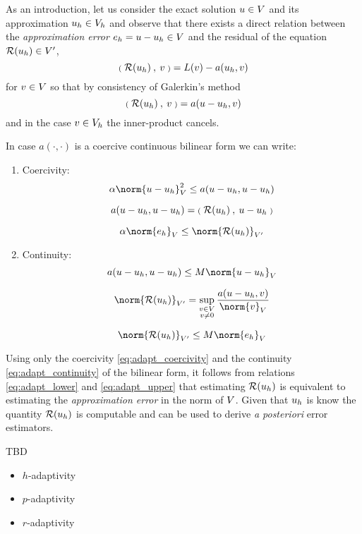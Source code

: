 \medskip
As an introduction, let us consider the exact solution $u\in{V}$ and its approximation ${u_h}\in{{V}}_h$ and observe that there exists a direct relation between the \textit{approximation error} $e_h = u - {u_h} \in{V}$ and the residual of the equation ${\mathcal{R}({u_h})}\in{V}'$,
\[
{{\scriptstyle\mathbf{(}}\;{\mathcal{R}({u_h})}\:,\: v \;{\scriptstyle\mathbf{)}}} = L(v) - a({u_h},  v)
\]
for $v\in{V}$ so that by consistency of Galerkin's method
\[
{{\scriptstyle\mathbf{(}}\;{\mathcal{R}({u_h})}\:,\: v \;{\scriptstyle\mathbf{)}}} = a(u - {u_h},  v)
\]
and in the case $v\in{{V}}_h$ the inner-product cancels.

\medskip
In case $a(\cdot,\cdot)$ is a coercive continuous bilinear form we can write:
\begin{enumerate}
\item Coercivity:
\begin{equation}\label{eq:adapt_coercivity}
\alpha \norm{u - \uh}_{\xV}^2 \leq a(u - \uh,  u - \uh)
\end{equation}


\[
a(u - {u_h},  u - {u_h}) = {{\scriptstyle\mathbf{(}}\;{\mathcal{R}({u_h})}\:,\: u -{u_h} \;{\scriptstyle\mathbf{)}}}
\]

\begin{equation}\label{eq:adapt_lower}
\alpha \norm{e_h}_{\xV} \leq \norm{\Res{\uh}}_{\xV'}
\end{equation}


\item Continuity:
\begin{equation}\label{eq:adapt_continuity}
a(u - \uh,  u - \uh) \leq M \norm{u - \uh}_{\xV}
\end{equation}


\[
\norm{\Res{\uh}}_{\xV'} = \sup_{\substack{v\in\xV\\v\neq 0}} \dfrac{a(u - \uh, v)}{\norm{v}_\xV}
\]

\begin{equation}\label{eq:adapt_upper}
\norm{\Res{\uh}}_{\xV'} \leq M \norm{e_h}_{\xV}
\end{equation}


\end{enumerate}

Using only the coercivity \eqref{eq:adapt_coercivity} and the continuity \eqref{eq:adapt_continuity} of the bilinear form, it follows from relations \eqref{eq:adapt_lower} and \eqref{eq:adapt_upper} that estimating ${\mathcal{R}({u_h})}$ is equivalent to estimating the \textit{approximation error} in the norm of ${V}$.
Given that ${u_h}$ is know the quantity ${\mathcal{R}({u_h})}$ is computable and can be used to derive \textit{a posteriori} error estimators.

\medskip
TBD
\begin{itemize}
\item $h$-adaptivity
\item $p$-adaptivity
\item $r$-adaptivity
\end{itemize}

